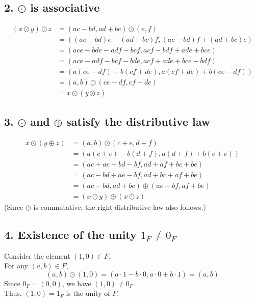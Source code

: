 \documentclass[11pt, a4paper]{article}
\begin{document}
\subsection*{2. $\odot$ is associative}
\begin{align*}
    (x \odot y) \odot z &= (ac-bd, ad+bc) \odot (e,f) \\
    &= ((ac-bd)e - (ad+bc)f, (ac-bd)f + (ad+bc)e) \\
    &= (ace - bde - adf - bcf, acf - bdf + ade + bce)\\
    &= (ace - adf - bcf - bde, acf + ade + bce - bdf)\\
    &= (a(ce-df) - b(cf+de), a(cf+de) + b(ce-df)) \\
    &= (a,b) \odot (ce-df, cf+de) \\
    &= x \odot (y \odot z)
\end{align*}

\subsection*{3. $\odot$ and $\oplus$ satisfy the distributive law}
\begin{align*}
    x \odot (y \oplus z) &= (a,b) \odot (c+e, d+f) \\
    &= (a(c+e) - b(d+f), a(d+f) + b(c+e)) \\
    &= (ac+ae - bd-bf, ad+af + bc+be) \\
    &= (ac-bd + ae-bf, ad+bc + af+be) \\
    &= (ac-bd, ad+bc) \oplus (ae-bf, af+be) \\
    &= (x \odot y) \oplus (x \odot z)
\end{align*}
(Since $\odot$ is commutative, the right distributive law also follows.)

\subsection*{4. Existence of the unity $1_F \neq 0_F$}
Consider the element $(1,0) \in F$. \\
For any $(a,b) \in F$, 
\[
    (a,b) \odot (1,0) = (a\cdot 1 - b \cdot 0, a \cdot 0 + b \cdot 1) = (a,b)
\]
Since $0_F = (0,0)$, we have $(1,0) \neq 0_F$. \\
Thus, $(1,0) = 1_F$ is the unity of $F$.
\end{document}
